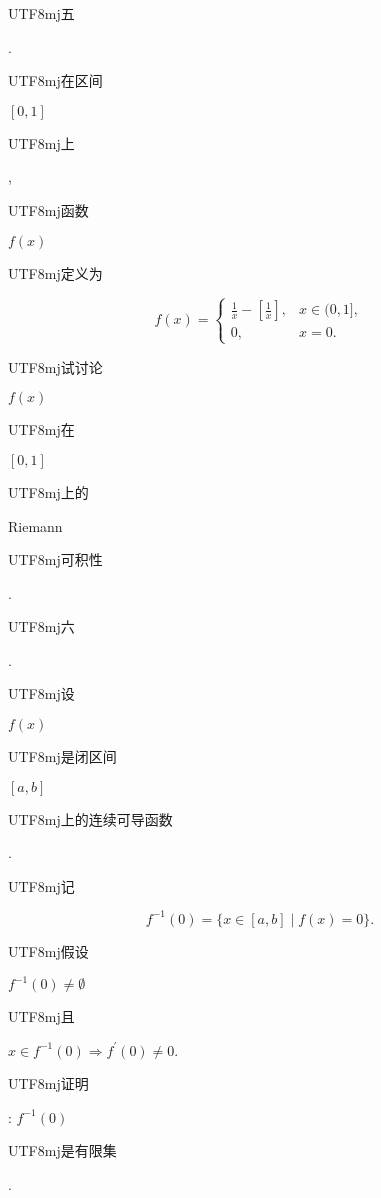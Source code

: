 \documentclass[10pt]{article}
\begin{document}
\begin{CJK}{UTF8}{mj}五\end{CJK}. \begin{CJK}{UTF8}{mj}在区间\end{CJK} $[0,1]$ \begin{CJK}{UTF8}{mj}上\end{CJK}, \begin{CJK}{UTF8}{mj}函数\end{CJK} $f(x)$ \begin{CJK}{UTF8}{mj}定义为\end{CJK}
$$
f(x)= \begin{cases}\frac{1}{x}-\left[\frac{1}{x}\right], & x \in(0,1], \\ 0, & x=0 .\end{cases}
$$
\begin{CJK}{UTF8}{mj}试讨论\end{CJK} $f(x)$ \begin{CJK}{UTF8}{mj}在\end{CJK} $[0,1]$ \begin{CJK}{UTF8}{mj}上的\end{CJK} Riemann \begin{CJK}{UTF8}{mj}可积性\end{CJK}.

\begin{CJK}{UTF8}{mj}六\end{CJK}. \begin{CJK}{UTF8}{mj}设\end{CJK} $f(x)$ \begin{CJK}{UTF8}{mj}是闭区间\end{CJK} $[a, b]$ \begin{CJK}{UTF8}{mj}上的连续可导函数\end{CJK}. \begin{CJK}{UTF8}{mj}记\end{CJK}
$$
f^{-1}(0)=\{x \in[a, b] \mid f(x)=0\} .
$$
\begin{CJK}{UTF8}{mj}假设\end{CJK} $f^{-1}(0) \neq \emptyset$ \begin{CJK}{UTF8}{mj}且\end{CJK} $x \in f^{-1}(0) \Rightarrow f^{\prime}(0) \neq 0$. \begin{CJK}{UTF8}{mj}证明\end{CJK}: $f^{-1}(0)$ \begin{CJK}{UTF8}{mj}是有限集\end{CJK}.
\end{document}

